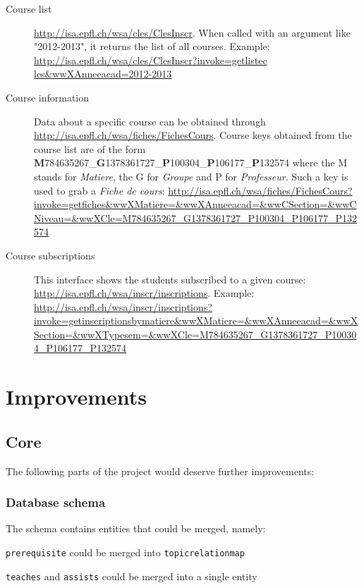 \begin{description}
\item[Course list] \url{http://isa.epfl.ch/wsa/cles/ClesInscr}. When called with an argument like "2012-2013", it returns the list of all courses. Example: 
\url{http://isa.epfl.ch/wsa/cles/ClesInscr?invoke=getlistec
les&wwXAnneeacad=2012-2013}

\item[Course information] Data about a specific course can be obtained through \url{http://isa.epfl.ch/wsa/fiches/FichesCours}. Course keys obtained from the course list are of the form \textbf{M}784635267\_\textbf{G}1378361727\_\textbf{P}100304\_\textbf{P}106177\_\textbf{P}132574
where the M stands for \emph{Matiere}, the G for \emph{Groupe} and P for \emph{Professeur}. Such a key is used to grab a \emph{Fiche de cours}: \url{http://isa.epfl.ch/wsa/fiches/FichesCours?invoke=getfiches&wwXMatiere=&wwXAnneeacad=&wwCSection=&wwCNiveau=&wwXCle=M784635267_G1378361727_P100304_P106177_P132574}
\item[Course subscriptions] This interface shows the students subscribed to a given course: \url{http://isa.epfl.ch/wsa/inscr/inscriptions}. Example: \url{http://isa.epfl.ch/wsa/inscr/inscriptions?invoke=getinscriptionsbymatiere&wwXMatiere=&wwXAnneeacad=&wwXSection=&wwXTypesem=&wwXCle=M784635267_G1378361727_P100304_P106177_P132574}
\end{description}


\chapter{Improvements}
\section{Core}
The following parts of the project would deserve further improvements:

\subsection{Database schema}
The schema contains entities that could be merged, namely:

\begin{description}
\item \verb|prerequisite| could be merged into \verb|topicrelationmap|
\item \verb|teaches| and \verb|assists| could be merged into a single entity
\end{description}

